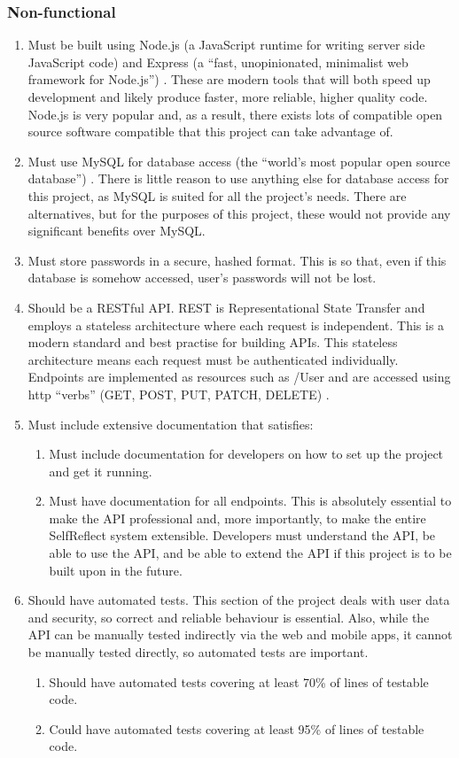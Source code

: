 \documentclass[11pt,openright,a4paper]{report}
\begin{document}
\subsubsection{Non-functional}
\begin{enumerate}
\item Must be built using Node.js (a JavaScript runtime for writing server side JavaScript code) \parencite{nodejs} and Express (a \enquote{fast, unopinionated, minimalist web framework for Node.js}) \parencite{expressjs}. These are modern tools that will both speed up development and likely produce faster, more reliable, higher quality code. Node.js is very popular and, as a result, there exists lots of compatible open source software compatible that this project can take advantage of.
\item Must use MySQL for database access (the \enquote{world's most popular open source database}) \parencite{mysql}. There is little reason to use anything else for database access for this project, as MySQL is suited for all the project's needs. There are alternatives, but for the purposes of this project, these would not provide any significant benefits over MySQL.
\item Must store passwords in a secure, hashed format. This is so that, even if this database is somehow accessed, user's passwords will not be lost.
\item Should be a RESTful API. REST is Representational State Transfer and employs a stateless architecture where each request is independent. This is a modern standard and best practise for building APIs. This stateless architecture means each request must be authenticated individually. Endpoints are implemented as resources such as /User and are accessed using http \enquote{verbs} (GET, POST, PUT, PATCH, DELETE) \parencite{httpmethods}.
\item Must include extensive documentation that satisfies:
  \begin{enumerate}
  \item Must include documentation for developers on how to set up the project and get it running.
  \item Must have documentation for all endpoints. This is absolutely essential to make the API professional and, more importantly, to make the entire SelfReflect system extensible. Developers must understand the API, be able to use the API, and be able to extend the API if this project is to be built upon in the future.
  \end{enumerate}
\item Should have automated tests. This section of the project deals with user data and security, so correct and reliable behaviour is essential. Also, while the API can be manually tested indirectly via the web and mobile apps, it cannot be manually tested directly, so automated tests are important.
  \begin{enumerate}
  \item Should have automated tests covering at least 70\% of lines of testable code.
  \item Could have automated tests covering at least 95\% of lines of testable code.
  \end{enumerate}
\end{enumerate}
\end{document}
